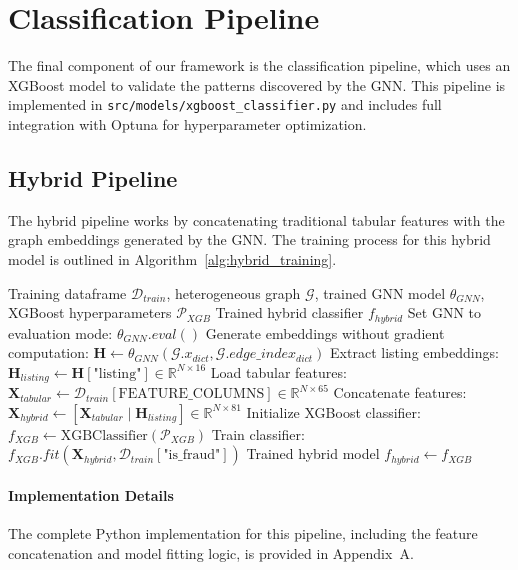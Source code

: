\section{Classification Pipeline}
\label{sec:4_7}

The final component of our framework is the classification pipeline, which uses an XGBoost model to validate the patterns discovered by the GNN. This pipeline is implemented in \texttt{src/models/xgboost\_classifier.py} and includes full integration with Optuna for hyperparameter optimization.

\subsection{Hybrid Pipeline}
\label{sec:4_7_1}

The hybrid pipeline works by concatenating traditional tabular features with the graph embeddings generated by the GNN. The training process for this hybrid model is outlined in Algorithm~\ref{alg:hybrid_training}.

\begin{algorithm}[H]
\caption{Hybrid Training Pipeline}
\label{alg:hybrid_training}
\begin{algorithmic}[1]
\REQUIRE Training dataframe $\mathcal{D}_{train}$, heterogeneous graph $\mathcal{G}$, trained GNN model $\theta_{GNN}$, XGBoost hyperparameters $\mathcal{P}_{XGB}$
\ENSURE Trained hybrid classifier $f_{hybrid}$
\STATE Set GNN to evaluation mode: $\theta_{GNN}.eval()$
\STATE Generate embeddings without gradient computation:
\STATE \quad $\mathbf{H} \gets \theta_{GNN}(\mathcal{G}.x_{dict}, \mathcal{G}.edge\_index_{dict})$
\STATE Extract listing embeddings: $\mathbf{H}_{listing} \gets \mathbf{H}[\text{"listing"}] \in \mathbb{R}^{N \times 16}$
\STATE Load tabular features: $\mathbf{X}_{tabular} \gets \mathcal{D}_{train}[\text{FEATURE\_COLUMNS}] \in \mathbb{R}^{N \times 65}$
\STATE Concatenate features: $\mathbf{X}_{hybrid} \gets [\mathbf{X}_{tabular} \mid \mathbf{H}_{listing}] \in \mathbb{R}^{N \times 81}$
\STATE Initialize XGBoost classifier: $f_{XGB} \gets \text{XGBClassifier}(\mathcal{P}_{XGB})$
\STATE Train classifier: $f_{XGB}.fit(\mathbf{X}_{hybrid}, \mathcal{D}_{train}[\text{"is\_fraud"}])$
\RETURN Trained hybrid model $f_{hybrid} \gets f_{XGB}$
\end{algorithmic}
\end{algorithm}

\paragraph{Implementation Details}
The complete Python implementation for this pipeline, including the feature concatenation and model fitting logic, is provided in Appendix~A.

